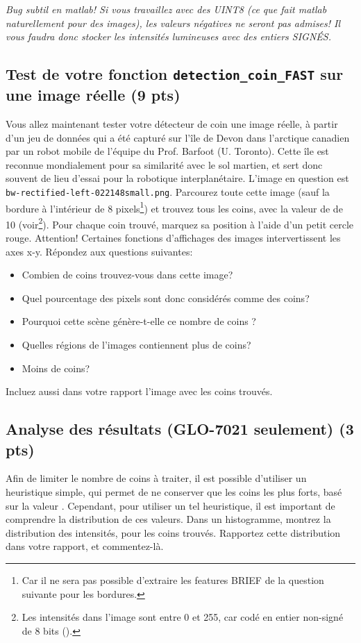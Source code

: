 \documentclass[12pt]{article}
\begin{document}
\emph{Bug subtil en matlab! Si vous travaillez avec des UINT8 (ce que fait matlab naturellement pour des images), les valeurs négatives ne seront pas admises! Il vous faudra donc stocker les intensités lumineuses avec des entiers SIGNÉS.}

\subsection{Test de votre fonction \texttt{detection\_coin\_FAST} sur une image réelle (9 pts)}
Vous allez maintenant tester votre détecteur de coin une image réelle, à partir d'un jeu de données qui a été capturé sur l'île de Devon dans l'arctique canadien par un robot mobile de l'équipe du Prof. Barfoot (U. Toronto). Cette île est reconnue mondialement pour sa similarité avec le sol martien, et sert donc souvent de lieu d'essai pour la robotique interplanétaire. L'image en question est \texttt{bw-rectified-left-022148small.png}. Parcourez toute cette image (sauf la bordure à l'intérieur de 8 pixels\footnote{Car il ne sera pas possible d'extraire les features BRIEF de la question suivante pour les bordures.}) et trouvez tous les coins, avec la valeur de  de 10 (voir\footnote{Les intensités dans l'image sont entre 0 et 255, car codé en entier non-signé de 8 bits ().}). Pour chaque coin trouvé, marquez sa position à l'aide d'un petit cercle rouge. Attention! Certaines fonctions d'affichages des images intervertissent les axes x-y.
Répondez aux questions suivantes:
\begin{itemize}
\item Combien de coins trouvez-vous dans cette image? 
\item Quel pourcentage des pixels sont donc considérés comme des coins? 
\item Pourquoi cette scène génère-t-elle ce nombre de coins ? 
\item Quelles régions de l'images contiennent plus de coins? 
\item Moins de coins? 
\end{itemize}
Incluez aussi dans votre rapport l'image avec les coins trouvés.


\subsection{Analyse des résultats (GLO-7021 seulement) (3 pts)}
Afin de limiter le nombre de coins à traiter, il est possible d'utiliser un heuristique simple, qui permet de ne conserver que les coins les plus forts, basé sur la valeur . Cependant, pour utiliser un tel heuristique, il est important de comprendre la distribution de ces valeurs. Dans un histogramme, montrez la distribution des intensités, pour les coins trouvés. Rapportez cette distribution dans votre rapport, et commentez-là.
\end{document}
